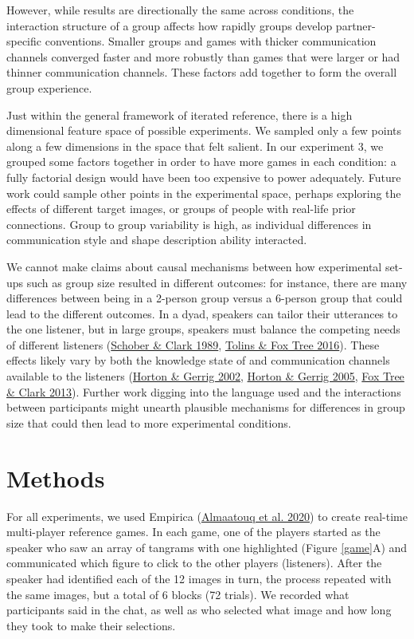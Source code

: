 \documentclass[
  english,
  a4paper,
]{article}
\begin{document}
However, while results are directionally the same across conditions, the interaction structure of a group affects how rapidly groups develop partner-specific conventions. Smaller groups and games with thicker communication channels converged faster and more robustly than games that were larger or had thinner communication channels. These factors add together to form the overall group experience.

Just within the general framework of iterated reference, there is a high dimensional feature space of possible experiments. We sampled only a few points along a few dimensions in the space that felt salient. In our experiment 3, we grouped some factors together in order to have more games in each condition: a fully factorial design would have been too expensive to power adequately. Future work could sample other points in the experimental space, perhaps exploring the effects of different target images, or groups of people with real-life prior connections. Group to group variability is high, as individual differences in communication style and shape description ability interacted.

We cannot make claims about causal mechanisms between how experimental set-ups such as group size resulted in different outcomes: for instance, there are many differences between being in a 2-person group versus a 6-person group that could lead to the different outcomes. In a dyad, speakers can tailor their utterances to the one listener, but in large groups, speakers must balance the competing needs of different listeners (\protect\hyperlink{ref-schober1989}{Schober \& Clark 1989}, \protect\hyperlink{ref-tolins2016}{Tolins \& Fox Tree 2016}). These effects likely vary by both the knowledge state of and communication channels available to the listeners (\protect\hyperlink{ref-horton2002}{Horton \& Gerrig 2002}, \protect\hyperlink{ref-horton2005}{Horton \& Gerrig 2005}, \protect\hyperlink{ref-fox-tree2013}{Fox Tree \& Clark 2013}). Further work digging into the language used and the interactions between participants might unearth plausible mechanisms for differences in group size that could then lead to more experimental conditions.

\hypertarget{methods}{%
\section{Methods}\label{methods}}

For all experiments, we used Empirica (\protect\hyperlink{ref-almaatouqEmpiricaVirtualLab2020}{Almaatouq et al. 2020}) to create real-time multi-player reference games. In each game, one of the players started as the speaker who saw an array of tangrams with one highlighted (Figure \ref{game}A) and communicated which figure to click to the other players (listeners). After the speaker had identified each of the 12 images in turn, the process repeated with the same images, but a total of 6 blocks (72 trials). We recorded what participants said in the chat, as well as who selected what image and how long they took to make their selections.
\end{document}
